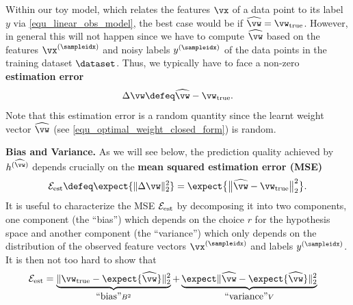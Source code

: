 \documentclass[12pt]{report}
\begin{document}
Within our toy model, which relates the features $\vx$ of a data point to its label $y$ via \eqref{equ_linear_obs_model}, 
the best case would be if $\widehat{\vw} = \vw_{\rm true}$. However, in general this will not happen since we have to 
compute $\widehat{\vw}$ based on the features $\vx^{(\sampleidx)}$ and noisy labels $y^{(\sampleidx)}$ of the data 
points in the training dataset $\dataset$. Thus, we typically have to face a non-zero {\bf estimation error}
\begin{equation}
\label{equ_def_est_error}
\Delta \vw \defeq \widehat{\vw} - \vw_{\rm true}. 
\end{equation} 
Note that this estimation error is a random quantity since the learnt weight vector $\widehat{\vw}$ 
(see \eqref{equ_optimal_weight_closed_form}) is random.

{\bf Bias and Variance.} 
As we will see below, the prediction quality achieved by $h^{(\widehat{\vw})}$ depends crucially on the 
{\bf mean squared estimation error (MSE)}
\begin{equation}
\label{equ_def_est_err}
\mathcal{E}_{\rm est} \defeq \expect \{  \| \Delta \vw \|^{2}_{2} \} =  \expect \big\{ \big \| \widehat{\vw} - \vw_{\rm true} \big\|^{2}_{2} \big \}. 
\end{equation}
It is useful to characterize the MSE $\mathcal{E}_{\rm est}$ by decomposing it into two components, one component 
(the ``bias'') which depends on the choice $r$ for the hypothesis space and another component (the ``variance'') which 
only depends on the distribution of the observed feature vectors $\vx^{(\sampleidx)}$ and labels $y^{(\sampleidx)}$. 
It is then not too hard to show that 
\vspace*{-1mm}
\begin{align}
\label{equ_bias_var_decomp}
\mathcal{E}_{\rm est} & = \underbrace{ \| \vw_{\rm true} - \expect \{ \widehat{\vw} \} \|^{2}_{2} }_{\mbox{``bias''} B^2}+ \underbrace{\expect \| \widehat{\vw} - \expect \{ \widehat{\vw} \} \|^{2}_{2}}_{\mbox{``variance''} V} 
\end{align} 
\end{document}
